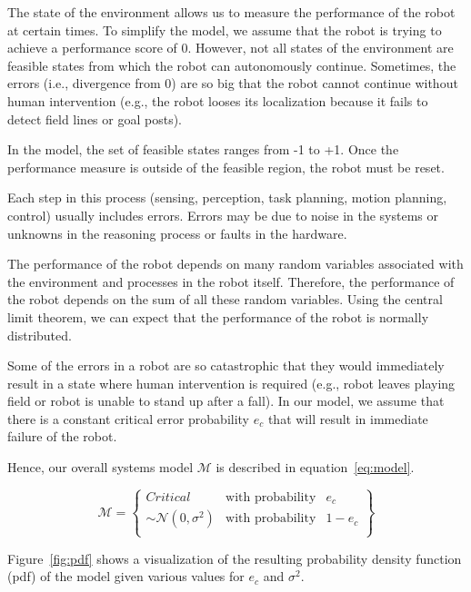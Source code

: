\documentclass[runningheads]{llncs}
\begin{document}
The state of the environment allows us to measure the performance of the robot at certain times.
To simplify the model, we assume that the robot is trying to achieve a performance score of 0.
However, not all states of the environment are feasible states from which the robot can autonomously continue.
Sometimes, the errors (i.e., divergence from 0) are so big that the robot cannot continue without human intervention (e.g., the robot looses its localization because it fails to detect field lines or goal posts).

In the model, the set of feasible states ranges from -1 to +1. 
Once the performance measure is outside of the feasible region, the robot must be reset.

Each step in this process (sensing, perception, task planning, motion planning, control) usually includes errors. 
Errors may be due to noise in the systems or unknowns in the reasoning process or faults in the hardware.

The performance of the robot depends on many random variables associated with the environment and processes in the robot itself.
Therefore, the performance of the robot depends on the sum of all these random variables.
Using the central limit theorem, we can expect that the performance of the robot is normally distributed.

Some of the errors in a robot are so catastrophic that they would immediately result in a state where human intervention is required (e.g., robot leaves playing field or robot is unable to stand up after a fall).
In our model, we assume that there is a constant critical error probability $e_{c}$ that will result in immediate failure of the robot.

Hence, our overall systems model $\mathcal{M}$ is described in equation~\ref{eq:model}.

\begin{equation}
    \label{eq:model}
    \mathcal{M} = 
       \left\{
          \begin{array}{cll}
            Critical & \mbox{with probability} &  e_c \\
            \sim \mathcal{N}(0, \sigma^2) & \mbox{with probability} & 1 - e_c \\
          \end{array}
       \right\}
\end{equation}

Figure~\ref{fig:pdf} shows a visualization of the resulting probability density function (pdf) of the model given various values for $e_c$ and $\sigma^2$.
\end{document}
